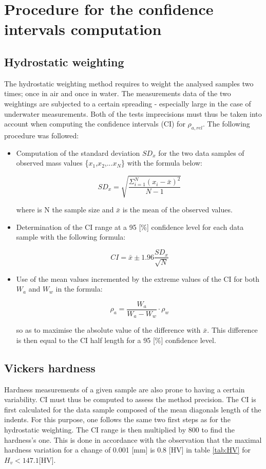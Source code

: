 
\chapter{Procedure for the confidence intervals computation} %

\label{AppendixC} %

\section{Hydrostatic weighting}

The hydrostatic weighting method requires to weight the analysed samples two times; once in air and once in water. The measurements data of the two weightings are subjected to a certain spreading - especially large in the case of underwater measurements. Both of the tests imprecisions must thus be taken into account when computing the confidence intervals (CI) for $\rho_{a,rel}$. The following procedure was followed:

\begin{itemize}
\item Computation of the standard deviation $SD_x$ for the two data samples of observed mass values \{$x_1$,$x_2$,...$x_N$\} with the formula below:

$$SD_x=\sqrt{\frac{\Sigma^N_{i=1}(x_i-\bar{x})^2}{N-1}} $$

where is N the sample size and $\bar{x}$ is the mean of the observed values.

\item Determination of the CI range at a 95 [\%] confidence level for each data sample with the following formula:

$$CI= \bar{x} \pm 1.96 \frac{SD_x}{\sqrt{N}}$$

\item Use of the mean values incremented by the extreme values of the CI for both $W_a$ and $W_w$ in the formula:


$$\rho_a=\frac{W_a}{W_a-W_w} \cdot \rho_w $$

so as to maximise the absolute value of the difference with $\bar{x}$. This difference is then equal to the CI half length for a 95 [\%] confidence level.
\end{itemize}

\section{Vickers hardness}

Hardness measurements of a given sample are also prone to having a certain variability. CI must thus be computed to assess the method precision. The CI is first calculated for the data sample composed of the mean diagonals length of the indents. For this purpose, one follows the same two first steps as for the hydrostatic weighting. The CI range is then multiplied by 800 to find the hardness's one. This is done in accordance with the observation that the maximal hardness variation for a change of 0.001 [mm] is 0.8 [HV] in table \ref{tab:HV} for $H_v<147.1 $[HV].%